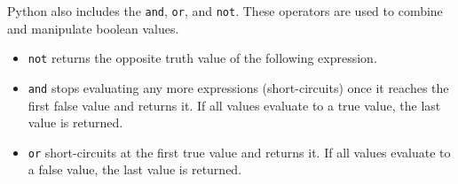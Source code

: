 Python also includes the  \texttt{and}, \texttt{or},
and \texttt{not}. These operators are used to combine and manipulate boolean
values.
\begin{itemize}
    \item \texttt{not} returns the opposite truth value of the following expression.
    \item \texttt{and} stops evaluating any more expressions (short-circuits)
        once it reaches the first false value and returns it. If all values
        evaluate to a true value, the last value is returned.
    \item \texttt{or} short-circuits at the first true value and returns it. If
        all values evaluate to a false value, the last value is returned.
\end{itemize}

